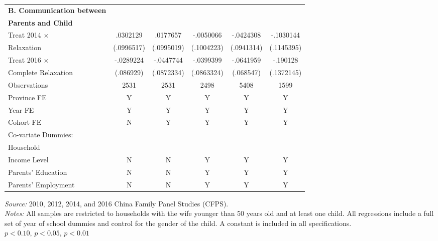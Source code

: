 \documentclass[12pt]{extarticle}
\begin{document}
\begin{table}
\begin{threeparttable}
\begin{tabular}{l*{5}{c}}
\textbf{B. Communication between} \\
\qquad \textbf{Parents and Child} \\
Treat 2014 $\times$ &    .0302129   &    .0177657   &   -.0050066   &   -.0424308   &   -.1030144   \\
\quad 2014 Relaxation     &  (.0996517)   &  (.0995019)   &  (.1004223)   &  (.0941314)   &  (.1145395)   \\
Treat 2016 $\times$ &   -.0289224   &   -.0447744   &   -.0399399   &   -.0641959   &    -.190128   \\
\quad Complete Relaxation &   (.086929)   &  (.0872334)   &  (.0863324)   &   (.068547)   &  (.1372145)   \\
Observations        &        2531   &        2531   &        2498   &        5408   &        1599   \\
\hline
Province FE &  Y &  Y & Y & Y & Y \\
Year FE &  Y &  Y & Y & Y & Y \\
Cohort FE & N & Y & Y & Y & Y \\
Co-variate Dummies: \\
\quad Household \\
\qquad Income Level & N & N & Y & Y & Y \\
\quad Parents' Education &  N &  N & Y & Y & Y \\
\quad Parents' Employment &  N &  N & Y & Y & Y \\
\hline\hline
\end{tabular}
\begin{tablenotes}
\footnotesize \textit{Source:} 2010, 2012, 2014, and 2016 China Family Panel Studies (CFPS). \\
\textit{Notes:} All samples are restricted to households with the wife younger than 50 years old and at least one child. All regressions include a full set of year of school dummies and control for the gender of the child. A constant is included in all specifications. \\
\quad \sym{*} \(p<0.10\), \sym{**} \(p<0.05\), \sym{***} \(p<0.01\)
\end{tablenotes}
\end{threeparttable}
\end{table}

\clearpage
\end{document}
